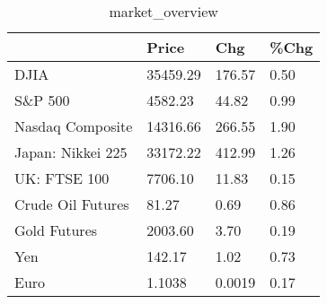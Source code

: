 \documentclass{article}%
\begin{document}
%


\begin{table}[htbp]%
\caption{market\_overview}%
\centering%
\begin{adjustbox}{width=1\textwidth}%
\begin{tabular}{llll}
\toprule
                  &    Price &    Chg & \%Chg \\
\midrule
             DJIA & 35459.29 & 176.57 & 0.50 \\
          S\&P 500 &  4582.23 &  44.82 & 0.99 \\
 Nasdaq Composite & 14316.66 & 266.55 & 1.90 \\
Japan: Nikkei 225 & 33172.22 & 412.99 & 1.26 \\
     UK: FTSE 100 &  7706.10 &  11.83 & 0.15 \\
Crude Oil Futures &    81.27 &   0.69 & 0.86 \\
     Gold Futures &  2003.60 &   3.70 & 0.19 \\
              Yen &   142.17 &   1.02 & 0.73 \\
             Euro &   1.1038 & 0.0019 & 0.17 \\
\bottomrule
\end{tabular}
%
\end{adjustbox}%
\end{table}

%
\end{document}
